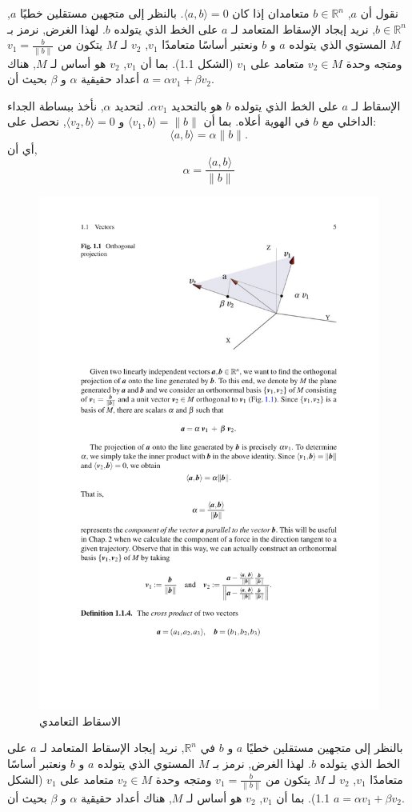 \begin{definition} 
نقول أن \( a \), \( b \in \mathbb{R}^n \) متعامدان إذا كان \( \langle a, b \rangle = 0 \). بالنظر إلى متجهين مستقلين خطيًا \( a \), \( b \in \mathbb{R}^n \), نريد إيجاد الإسقاط المتعامد لـ \( a \) على الخط الذي يتولده \( b \). لهذا الغرض, نرمز بـ \( M \) المستوي الذي يتولده \( a \) و \( b \) ونعتبر أساسًا متعامدًا { \( v_1 \), \( v_2 \) } لـ \( M \) يتكون من \( v_1 = \frac{b}{\|b\|} \) ومتجه وحدة \( v_2 \in M \) متعامد على \( v_1 \) (الشكل 1.1). بما أن { \( v_1 \), \( v_2 \) } هو أساس لـ \( M \), هناك أعداد حقيقية \( \alpha \) و \( \beta \) بحيث أن \( a = \alpha v_1 + \beta v_2 \).
\end{definition}

الإسقاط لـ \( a \) على الخط الذي يتولده \( b \) هو بالتحديد \( \alpha v_1 \). لتحديد \( \alpha \), نأخذ ببساطة الجداء الداخلي مع \( b \) في الهوية أعلاه. بما أن \( \langle v_1, b \rangle = \|b\| \) و \( \langle v_2, b \rangle = 0 \), نحصل على:
\[
\langle a, b \rangle = \alpha \|b\|. 
\]
أي أن,
\[ 
\alpha = \frac{\langle a, b \rangle}{\|b\|} 
\]

\begin{figure}[!h]
    \centering
    \includegraphics[width=0.5\linewidth]{fig_projection.pdf}
    \caption{الاسقاط التعامدي}
    \label{fig:enter-label}
\end{figure}

بالنظر إلى متجهين مستقلين خطيًا \( a \) و \( b \) في \( \mathbb{R}^n \), نريد إيجاد الإسقاط المتعامد لـ \( a \) على الخط الذي يتولده \( b \). لهذا الغرض, نرمز بـ \( M \) المستوي الذي يتولده \( a \) و \( b \) ونعتبر أساسًا متعامدًا { \( v_1 \), \( v_2 \) } لـ \( M \) يتكون من \( v_1 = \frac{b}{\|b\|} \) ومتجه وحدة \( v_2 \in M \) متعامد على \( v_1 \) (الشكل 1.1). بما أن { \( v_1 \), \( v_2 \) } هو أساس لـ \( M \), هناك أعداد حقيقية \( \alpha \) و \( \beta \) بحيث أن \( a = \alpha v_1 + \beta v_2 \).

